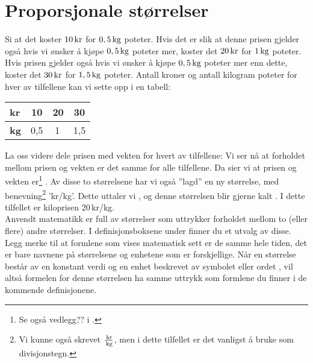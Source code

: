 \section{Proporsjonale størrelser \label{Propstorl}}
Si at det koster $ 10\,\textrm{kr}$ for $ 0,5\,\textrm{kg} $ poteter. Hvis det er slik at denne prisen gjelder også hvis vi ønsker å kjøpe $ 0,5\,\textrm{kg} $ poteter mer, koster det $ 20\,\textrm{kr} $ for $ 1\,\textrm{kg} $ poteter. Hvis prisen gjelder også hvis vi ønsker å kjøpe $ 0,5\,\textrm{kg} $ poteter mer enn dette, koster det $ 30\,\textrm{kr} $ for $ 1,5\,\textrm{kg} $ poteter. Antall kroner og antall kilogram poteter for hver av tilfellene kan vi sette opp i en tabell: \vs
\begin{center}
	\begin{tabular}{|l|c|c|c|}
		\hline
\textbf{kr} & 10  & 20 & 30 \\ \hline
\textbf{kg} & 0,5 & 1\,& 1,5 \\ \hline
	\end{tabular}
\end{center}
La oss videre dele prisen med vekten for hvert av tilfellene:
Vi ser nå at forholdet mellom prisen og vekten er det samme for alle tilfellene. Da sier vi at prisen og vekten er\footnote{Se også vedlegg?? i \mb.} . Av disse to størrelsene har vi også ''lagd'' en ny størrelse, med benevning\footnote{Vi kunne også skrevet $ \frac{\,\textrm{kr}}{\,\textrm{kg}} $, men i dette tilfellet er det vanligst å bruke \sym{/} som divisjonstegn.} 'kr/kg'. Dette uttaler vi , og denne størrelsen blir gjerne kalt . I dette tilfellet er kiloprisen 20\,kr/kg. \\[12pt]

Anvendt matematikk er full av størrelser som uttrykker forholdet mellom to (eller flere) andre størrelser. I definisjonsboksene under finner du et utvalg av disse. Legg merke til at formlene som vises matematisk sett er de samme hele tiden, det er bare navnene på størrelsene og enhetene som er forskjellige. Når en størrelse består av en konstant verdi og en enhet beskrevet av symbolet \sym{$ / $} eller ordet , vil altså formelen for denne størrelsen ha samme uttrykk som formlene du finner i de kommende definisjonene.
\regv


